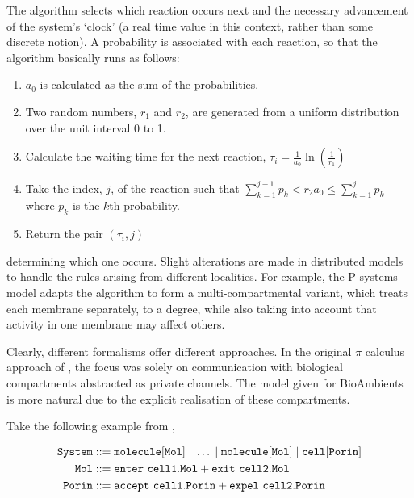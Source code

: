 The algorithm selects which reaction occurs next and the necessary
advancement of the system's `clock' (a real time value in this context,
rather than some discrete notion).  A probability is associated with
each reaction, so that the algorithm basically runs as follows:

\begin{enumerate}
\item $a_0$ is calculated as the sum of the probabilities.
\item Two random numbers, $r_1$ and $r_2$, are generated from a uniform
      distribution over the unit interval 0 to 1.
\item Calculate the waiting time for the next reaction, $\tau_i =
      \frac{1}{a_0} \ln (\frac{1}{r_1})$
\item Take the index, $j$, of the reaction such that
      $\displaystyle\sum_{k=1}^{j-1} p_k < r_2 a_0 \le
      \displaystyle\sum_{k=1}^jp_k$ where $p_k$ is the $k$th probability.
\item Return the pair $(\tau_i, j)$
\end{enumerate}

\noindent determining which one occurs.  Slight alterations are made in
distributed models to handle the rules arising from different localities.
For example, the P systems model \cite{fran} adapts the algorithm to
form a multi-compartmental variant, which treats each membrane
separately, to a degree, while also taking into account that activity
in one membrane may affect others.

Clearly, different formalisms offer different approaches.  In the
original $\pi$ calculus approach of \cite{biospi}, the focus was solely
on communication with biological compartments abstracted as private
channels.  The model given for BioAmbients \cite{cardelli:bioambients}
is more natural due to the explicit realisation of these compartments.

Take the following example from \cite{cardelli:bioambients},

\begin{equation}
\begin{aligned}
\mathtt{System} & ::= \mathtt{molecule[Mol] \pc \dots \pc molecule[Mol] \pc
 cell[Porin]} \\
\mathtt{Mol} & ::= \mathtt{enter\ cell1.Mol + exit\ cell2 . Mol} \\
\mathtt{Porin} & ::= \mathtt{accept\ cell1.Porin + expel\ cell2.Porin}
\end{aligned}
\end{equation}

